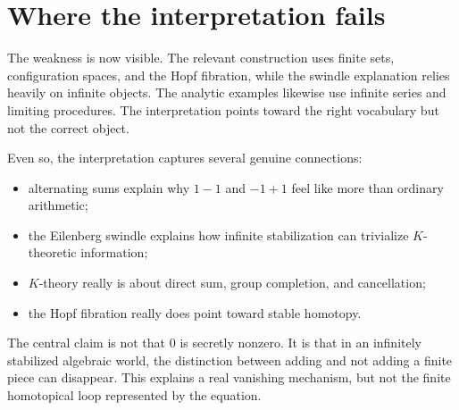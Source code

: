 \section{Where the interpretation fails}

The weakness is now visible.  The relevant construction uses finite sets, configuration spaces, and the Hopf fibration, while the swindle explanation relies heavily on infinite objects.  The analytic examples likewise use infinite series and limiting procedures.  The interpretation points toward the right vocabulary but not the correct object.

Even so, the interpretation captures several genuine connections:
\begin{itemize}
  \item alternating sums explain why \(1-1\) and \(-1+1\) feel like more than ordinary arithmetic;
  \item the Eilenberg swindle explains how infinite stabilization can trivialize \(K\)-theoretic information;
  \item \(K\)-theory really is about direct sum, group completion, and cancellation;
  \item the Hopf fibration really does point toward stable homotopy.
\end{itemize}

The central claim is not that \(0\) is secretly nonzero.  It is that in an infinitely stabilized algebraic world, the distinction between adding and not adding a finite piece can disappear.  This explains a real vanishing mechanism, but not the finite homotopical loop represented by the equation.
